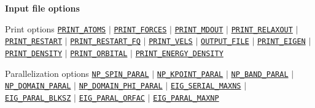 \begin{frame}[allowframebreaks]{\textbf{Input file options}}
  \begin{block}{Print options}
  \hyperlink{PRINT_ATOMS}{\texttt{PRINT\_ATOMS}} $\vert$
  \hyperlink{PRINT_FORCES}{\texttt{PRINT\_FORCES}} $\vert$
  \hyperlink{PRINT_MDOUT}{\texttt{PRINT\_MDOUT}} $\vert$
  \hyperlink{PRINT_RELAXOUT}{\texttt{PRINT\_RELAXOUT}} $\vert$
  \hyperlink{PRINT_RESTART}{\texttt{PRINT\_RESTART}} $\vert$
  \hyperlink{PRINT_RESTART_FQ}{\texttt{PRINT\_RESTART\_FQ}} $\vert$
  \hyperlink{PRINT_VELS}{\texttt{PRINT\_VELS}} $\vert$
  \hyperlink{OUTPUT_FILE}{\texttt{OUTPUT\_FILE}} $\vert$
  \hyperlink{PRINT_EIGEN}{\texttt{PRINT\_EIGEN}} $\vert$
  \hyperlink{PRINT_DENSITY}{\texttt{PRINT\_DENSITY}} $\vert$
  \hyperlink{PRINT_ORBITAL}{\texttt{PRINT\_ORBITAL}} $\vert$
  \hyperlink{PRINT_ENERGY_DENSITY}{\texttt{PRINT\_ENERGY\_DENSITY}}
  \end{block}
  
  \begin{block}{Parallelization options}
  \hyperlink{NP_SPIN_PARAL}{\texttt{NP\_SPIN\_PARAL}} $\vert$
  \hyperlink{NP_KPOINT_PARAL}{\texttt{NP\_KPOINT\_PARAL}} $\vert$
  \hyperlink{NP_BAND_PARAL}{\texttt{NP\_BAND\_PARAL}} $\vert$
  \hyperlink{NP_DOMAIN_PARAL}{\texttt{NP\_DOMAIN\_PARAL}} $\vert$
  \hyperlink{NP_DOMAIN_PHI_PARAL}{\texttt{NP\_DOMAIN\_PHI\_PARAL}} $\vert$
  \hyperlink{EIG_SERIAL_MAXNS}{\texttt{EIG\_SERIAL\_MAXNS}} $\vert$
  \hyperlink{EIG_PARAL_BLKSZ}{\texttt{EIG\_PARAL\_BLKSZ}} $\vert$
  \hyperlink{EIG_PARAL_ORFAC}{\texttt{EIG\_PARAL\_ORFAC}} $\vert$
  \hyperlink{EIG_PARAL_MAXNP}{\texttt{EIG\_PARAL\_MAXNP}}
  \end{block}

  \end{frame}
  